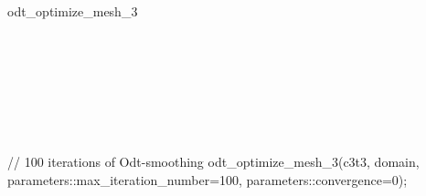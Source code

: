 \begin{ccRefFunction}{odt_optimize_mesh_3}
\ccSeeAlso

 \\
 \\
 \\
 \\
 \\
 \\

\ccExample 

\begin{ccExampleCode}
// 100 iterations of Odt-smoothing
odt_optimize_mesh_3(c3t3, domain, parameters::max_iteration_number=100, 
                    parameters::convergence=0);
\end{ccExampleCode}

\end{ccRefFunction}

\ccRefPageEnd

